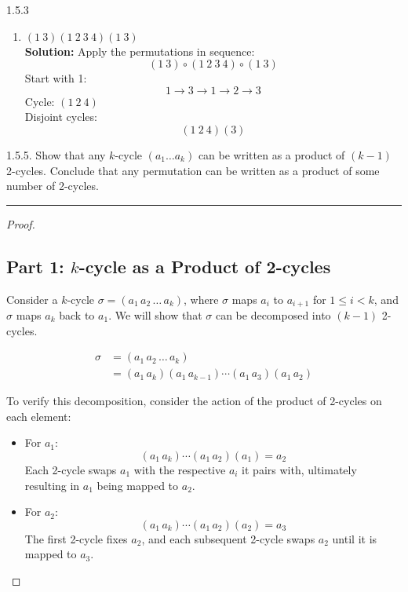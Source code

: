 \documentclass[12pt]{amsart}
\theoremstyle{definition}
\numberwithin{equation}{section}
\begin{document}
\begin{exercise}{1.5.3}
\begin{enumerate}[label=(\alph*)]
            \item \((1 \ 3)(1 \ 2 \ 3 \ 4)(1 \ 3)\)\\
            \textbf{Solution:} Apply the permutations in sequence:
            \[ (1 \ 3) \circ (1 \ 2 \ 3 \ 4) \circ (1 \ 3) \]
            Start with 1:
            \[ 1 \to 3 \to 1 \to 2 \to 3 \]
            Cycle: \( (1 \ 2 \ 4) \)\\
            Disjoint cycles: 
            \[
            (1 \ 2 \ 4)(3)
            \]
        
        \end{enumerate}        
    \end{exercise}
    \newpage

    \begin{exercise}{1.5.5.} Show that any $k$-cycle \((a_1 \dots a_k)\) can be written as a product of \((k-1)\) 2-cycles. Conclude that any permutation can be written as a product of some number of 2-cycles.
        \noindent\rule{\linewidth}{1pt}
        \begin{proof} \(\)
            \subsection*{Part 1: \( k \)-cycle as a Product of 2-cycles}

Consider a \( k \)-cycle \( \sigma = (a_1 \, a_2 \, \dots \, a_k) \), where \( \sigma \) maps \( a_i \) to \( a_{i+1} \) for \( 1 \leq i < k \), and \( \sigma \) maps \( a_k \) back to \( a_1 \). We will show that \( \sigma \) can be decomposed into \( (k-1) \) 2-cycles.

\begin{align*}
\sigma &= (a_1 \, a_2 \, \dots \, a_k) \\
       &= (a_1 \, a_k)(a_1 \, a_{k-1}) \cdots (a_1 \, a_3)(a_1 \, a_2)
\end{align*}

\noindent To verify this decomposition, consider the action of the product of 2-cycles on each element:

\begin{itemize}[label=--]
    \item For \( a_1 \):
    \[
    (a_1 \, a_k) \cdots (a_1 \, a_2)(a_1) = a_2
    \]
    Each 2-cycle swaps \( a_1 \) with the respective \( a_i \) it pairs with, ultimately resulting in \( a_1 \) being mapped to \( a_2 \).

    \item For \( a_2 \):
    \[
    (a_1 \, a_k) \cdots (a_1 \, a_2)(a_2) = a_3
    \]
    The first 2-cycle fixes \( a_2 \), and each subsequent 2-cycle swaps \( a_2 \) until it is mapped to \( a_3 \).


\end{itemize}
\end{proof}
\end{exercise}
\end{document}
